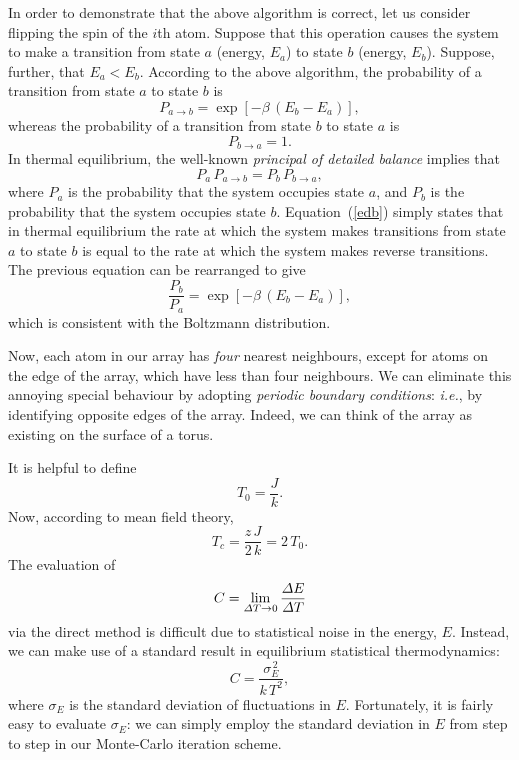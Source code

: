 In order to demonstrate that the above algorithm is correct, let us consider
flipping the spin of the $i$th atom. Suppose that this operation causes the
system to make a transition from state $a$ (energy, $E_a$) to state $b$ (energy, $E_b$).
Suppose, further, that $E_a < E_b$. According to the above algorithm, the probability
of a transition from state $a$ to state $b$ is
\begin{equation}
P_{a\rightarrow b} = \exp[-\beta\,(E_b-E_a)],
\end{equation}
whereas the probability of a transition from state $b$ to state $a$ is
\begin{equation}
P_{b\rightarrow a} = 1.
\end{equation}
In thermal equilibrium, the well-known {\em principal of detailed balance} implies that
\begin{equation}\label{edb}
P_a\,P_{a\rightarrow b} = P_b\,P_{b\rightarrow a},
\end{equation}
where $P_a$ is the probability that the system occupies state $a$, and  
 $P_b$ is the probability that the system occupies state $b$.
Equation~(\ref{edb}) simply states that in thermal equilibrium the rate at which
the system makes transitions from state $a$ to state $b$ is equal to the rate at
which the system makes  reverse transitions. The previous equation can be
rearranged to give
\begin{equation}
\frac{P_b}{P_a} = \exp[-\beta\,(E_b-E_a)],
\end{equation}
which is consistent with the Boltzmann distribution.

Now, each atom in our array has {\em four} nearest neighbours, except for  atoms on the
edge of the array, which have less than four   neighbours. We can eliminate
this annoying special behaviour by adopting {\em periodic boundary conditions}:
{\em i.e.}, by identifying opposite edges of the array. Indeed, we can think of the
array as existing on the surface of a torus.

It is helpful to define
\begin{equation}
T_0 = \frac{J}{k}.
\end{equation}
Now, according to mean field theory,
\begin{equation}
T_c = \frac{z\,J}{2\,k}= 2\,T_0.
\end{equation}
The evaluation of
\begin{equation}\label{direct}
C = \lim_{{\mit\Delta}T\rightarrow 0}\frac{{\mit\Delta}E}{{\mit\Delta} T}
\end{equation}
via the direct method is difficult due to  statistical noise in the energy,
$E$. Instead, we can make use of a standard result in equilibrium statistical
thermodynamics:
\begin{equation}\label{indirect}
C = \frac{\sigma_{E}^{\,2}}{k\,T^2},
\end{equation}
where $\sigma_E$ is the standard deviation of fluctuations in $E$. 
Fortunately, it is
fairly easy to evaluate $\sigma_E$: we can simply employ the standard deviation
in $E$ from step to step in our Monte-Carlo iteration scheme.

